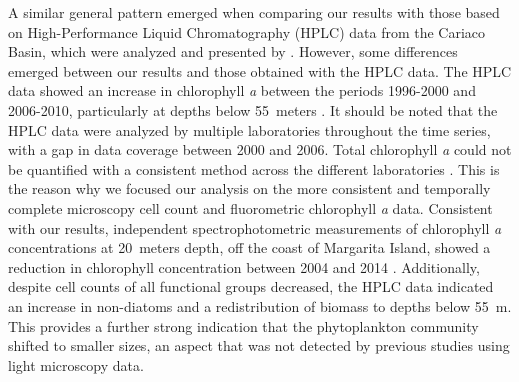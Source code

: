 \documentclass[draft]{agujournal2019}
\begin{document}
    A similar general pattern emerged when comparing our results with those based on High-Performance Liquid Chromatography (HPLC) data from the Cariaco Basin, which were analyzed and presented by . However, some differences emerged between our results and those obtained with the HPLC data. The HPLC data showed an increase in chlorophyll \textit{a} between the periods 1996-2000 and 2006-2010, particularly at depths below \qty{55}{meters} \cite{pinckney_phytoplankton_2015}. It should be noted that the HPLC data were analyzed by multiple laboratories throughout the time series, with a gap in data coverage between 2000 and 2006. Total chlorophyll \textit{a} could not be quantified with a consistent method across the different laboratories \cite{pinckney_phytoplankton_2015}. This is the reason why we focused our analysis on the more consistent and temporally complete microscopy cell count and fluorometric chlorophyll \textit{a} data.
    Consistent with our results, independent spectrophotometric measurements of chlorophyll \textit{a} concentrations at \qty{20}{meters} depth, off the coast of Margarita Island, showed a reduction in chlorophyll concentration between 2004 and 2014 \cite{gomez_gaspar_variacion_2025}.
    Additionally, despite cell counts of all functional groups decreased, the HPLC data indicated an increase in non-diatoms and a redistribution of biomass to depths below \qty{55}{\meter}. This provides a further strong indication that the phytoplankton community shifted to smaller sizes, an aspect that was not detected by previous studies using light microscopy data.
    
\end{document}
